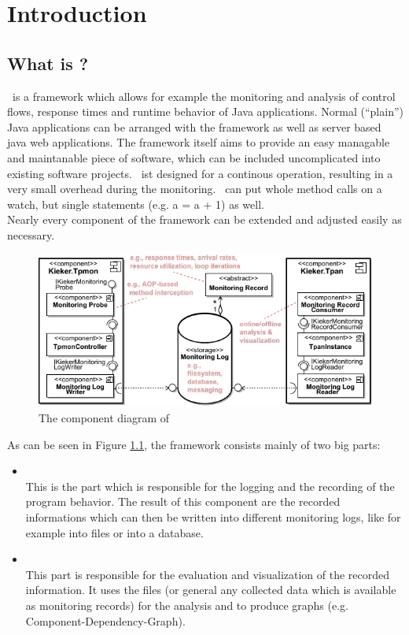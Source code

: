 \chapter{Introduction}
  \section{What is \Kieker?}
    \Kieker\ is a framework which allows for example the monitoring and analysis of control flows, response times and runtime behavior of Java applications. Normal (``plain'') Java applications can be arranged with the framework as well as server based java web applications. The framework itself aims to provide an easy managable and maintanable piece of software, which can be included uncomplicated into existing software projects. \Kieker\ ist designed for a continous operation, resulting in a very small overhead during the monitoring. \Kieker\ can put whole method calls on a watch, but single statements (e.g. a = a + 1) as well.\\
    Nearly every component of the framework can be extended and adjusted easily as necessary.
    \begin{figure}[H]
      \begin{center}
	\includegraphics[width=1.0\textwidth]{kiekerComponentDiagram.pdf}
	\caption{The component diagram of \Kieker}
	\label{image:kiekercomponentdiagram}
      \end{center}
    \end{figure}
    As can be seen in Figure \ref{image:kiekercomponentdiagram}, the framework consists mainly of two big parts:
    \begin{itemize}
      \item \textbf{\KiekerMonitoring}\\
	This is the part which is responsible for the logging and the recording of the program behavior. The result of this component are the recorded informations which can then be written into different monitoring logs, like for example into files or into a database.
      \item \textbf{\KiekerAnalysis}\\
	This part is responsible for the evaluation and visualization of the recorded information. It uses the files (or general any collected data which is available as monitoring records) for the analysis and to produce graphs (e.g. Component-Dependency-Graph).
    \end{itemize}

